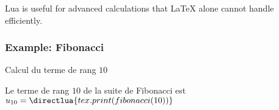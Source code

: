 Lua is useful for advanced calculations that LaTeX alone cannot handle efficiently.

\vspace{1em}
\begin{tkzexample}[latex=.5\textwidth]
\end{tkzexample}
%

\subsubsection{Example: Fibonacci}

 \vspace{1em}
  Calcul du terme de rang $10$

\vspace{1em}
\begin{tkzexample}[latex = .4\textwidth]
    Le terme de rang $10$ de la suite de
    Fibonacci est
    \(u_{10}=\directlua{tex.print(
    fibonacci(10))}\)
\end{tkzexample}
\endinput
